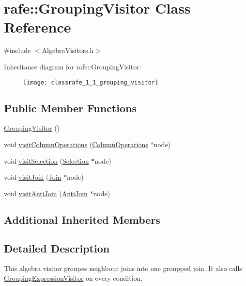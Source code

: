 \hypertarget{classrafe_1_1_grouping_visitor}{\section{rafe\+:\+:Grouping\+Visitor Class Reference}
\label{classrafe_1_1_grouping_visitor}
}


{\ttfamily \#include $<$Algebra\+Visitors.\+h$>$}

Inheritance diagram for rafe\+:\+:Grouping\+Visitor\+:\begin{figure}[H]
\begin{center}
\leavevmode
\texttt{[image: classrafe\_1\_1\_grouping\_visitor]}
\end{center}
\end{figure}
\subsection*{Public Member Functions}
\begin{DoxyCompactItemize}
\item 
\hyperlink{classrafe_1_1_grouping_visitor_a33accac3eae9e1ecb557acf7c7867d45}{Grouping\+Visitor} ()
\item 
void \hyperlink{classrafe_1_1_grouping_visitor_acb0f1d2cd1d7432d812191841efc6f60}{visit\+Column\+Operations} (\hyperlink{classrafe_1_1_column_operations}{Column\+Operations} $\ast$node)
\item 
void \hyperlink{classrafe_1_1_grouping_visitor_a7287bb0601e55028ef362604144eae23}{visit\+Selection} (\hyperlink{classrafe_1_1_selection}{Selection} $\ast$node)
\item 
void \hyperlink{classrafe_1_1_grouping_visitor_a519732d6b549b84cd543ab61aa7630f1}{visit\+Join} (\hyperlink{classrafe_1_1_join}{Join} $\ast$node)
\item 
void \hyperlink{classrafe_1_1_grouping_visitor_aa5f7889f7fc5ec289d7ee1107b441c0c}{visit\+Anti\+Join} (\hyperlink{classrafe_1_1_anti_join}{Anti\+Join} $\ast$node)
\end{DoxyCompactItemize}
\subsection*{Additional Inherited Members}


\subsection{Detailed Description}
This algebra visitor groupes neighbour joins into one groupped join. It also calls \hyperlink{classrafe_1_1_grouping_expression_visitor}{Grouping\+Expression\+Visitor} on every condition. 

